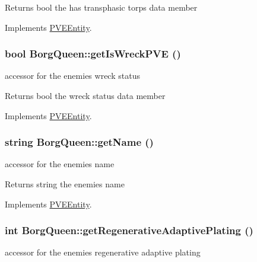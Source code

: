 \begin{DoxyReturn}{Returns}
bool the has transphasic torps data member 
\end{DoxyReturn}


Implements \hyperlink{classPVEEntity}{PVEEntity}.

\hypertarget{classBorgQueen_a52250f09cbd95239db7ea68174ad2c83}{
\subsubsection[{getIsWreckPVE}]{\setlength{\rightskip}{0pt plus 5cm}bool BorgQueen::getIsWreckPVE ()}}
\label{d6/d8d/classBorgQueen_a52250f09cbd95239db7ea68174ad2c83}
accessor for the enemies wreck status

\begin{DoxyReturn}{Returns}
bool the wreck status data member 
\end{DoxyReturn}


Implements \hyperlink{classPVEEntity}{PVEEntity}.

\hypertarget{classBorgQueen_a51bd430d9b7b50605622d489bae898cb}{
\subsubsection[{getName}]{\setlength{\rightskip}{0pt plus 5cm}string BorgQueen::getName ()}}
\label{d6/d8d/classBorgQueen_a51bd430d9b7b50605622d489bae898cb}
accessor for the enemies name

\begin{DoxyReturn}{Returns}
string the enemies name 
\end{DoxyReturn}


Implements \hyperlink{classPVEEntity}{PVEEntity}.

\hypertarget{classBorgQueen_a9f280ccd7ae93b4cf90a638189059b5b}{
\subsubsection[{getRegenerativeAdaptivePlating}]{\setlength{\rightskip}{0pt plus 5cm}int BorgQueen::getRegenerativeAdaptivePlating ()}}
\label{d6/d8d/classBorgQueen_a9f280ccd7ae93b4cf90a638189059b5b}
accessor for the enemies regenerative adaptive plating


